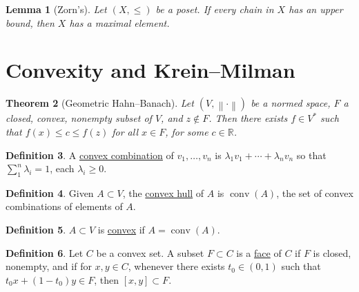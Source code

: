 \documentclass[12pt]{article}
\DeclareMathOperator{\conv}{conv}
\newcommand{\norm}[1]{\left\| #1 \right\|}
\newcommand{\R}{\mathbb{R}}
\newtheorem{thm}{Theorem}[section]
\newtheorem{lma}[thm]{Lemma}
\theoremstyle{definition}
\newtheorem{defn}[thm]{Definition}
\begin{document}
\begin{lma}[Zorn's]
	Let $(X, \leq)$ be a poset.
	If every chain in $X$ has an upper bound, then $X$ has a maximal element.
\end{lma}

\section{Convexity and Krein--Milman}

\begin{thm}[Geometric Hahn--Banach]
	Let $(V, \norm{\cdot})$ be a normed space, $F$ a closed, convex, nonempty subset of $V$, and $z \notin F$.
	Then there exists $f \in V^*$ such that $f(x) \leq c \leq f(z)$ for all $x \in F$, for some $c \in \R$.
\end{thm}

\begin{center}
\end{center}

\begin{defn}
	A \underline{convex combination} of $v_1, \dots, v_n$ is $\lambda_1 v_1 + \cdots + \lambda_n v_n$ so that $\sum_1^n \lambda_i = 1$, each $\lambda_i \geq 0$.
\end{defn}

\begin{defn}
	Given $A \subset V$, the \underline{convex hull} of $A$ is $\conv(A)$, the set of convex combinations of elements of $A$.
\end{defn}

\begin{defn}
	$A \subset V$ is \underline{convex} if $A = \conv(A)$.
\end{defn}

\begin{defn}
	Let $C$ be a convex set.
	A subset $F \subset C$ is a \underline{face} of $C$ if $F$ is closed, nonempty, and if for $x, y \in C$, whenever there exists $t_0 \in (0,1)$ such that $t_0 x + (1-t_0) y \in F$, then $[x,y] \subset F$.
\end{defn}
\end{document}
